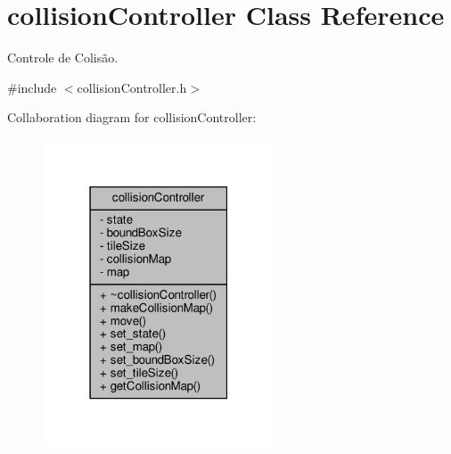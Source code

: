 \hypertarget{classcollisionController}{}\section{collision\+Controller Class Reference}
\label{classcollisionController}


Controle de Colisão.  




{\ttfamily \#include $<$collision\+Controller.\+h$>$}



Collaboration diagram for collision\+Controller\+:
\nopagebreak
\begin{figure}[H]
\begin{center}
\leavevmode
\includegraphics[width=195pt]{classcollisionController__coll__graph}
\end{center}
\end{figure}

